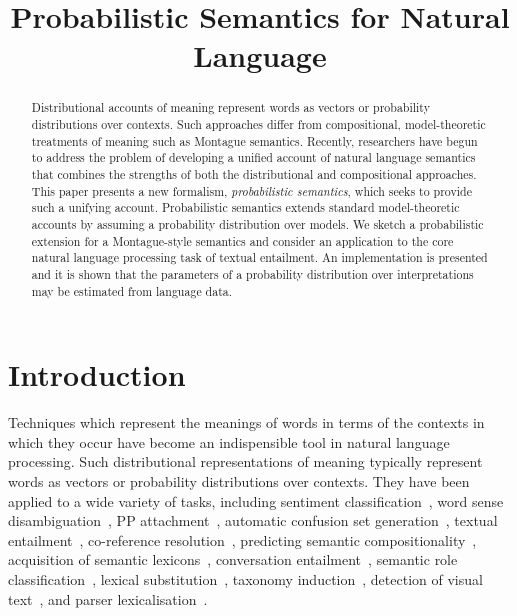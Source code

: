 \documentclass[letterpaper]{article}
\begin{document}
%
\title{Probabilistic Semantics for Natural Language}
\author{}
\maketitle
\begin{abstract}
Distributional accounts of meaning
represent words as vectors or probability distributions over
contexts. Such approaches differ from compositional, model-theoretic treatments of meaning
such as Montague semantics. Recently, researchers have begun to address the problem of  developing a unified account of natural language semantics that combines the strengths of both the distributional and compositional approaches. This paper presents a new formalism, {\em probabilistic semantics\/}, which seeks to provide such a unifying account. Probabilistic semantics extends standard model-theoretic
accounts by assuming a probability distribution over
models. We sketch a probabilistic extension for a Montague-style semantics and consider an application  to the core natural language processing task of textual entailment. An implementation is presented and it is shown that the parameters of a probability distribution over interpretations may be estimated from language data.


\end{abstract}


\section{Introduction}

Techniques which represent the meanings of words in terms of the contexts in
which they occur have become an indispensible tool in natural language
processing. Such distributional representations of meaning typically
represent words as vectors or probability distributions over
contexts. They have been applied to a wide variety of tasks,
including sentiment classification~\cite{Bollegala2011}, word sense
disambiguation~\cite{miller-EtAl:2012:PAPERS,khapra-EtAl:2010:ACL}, PP
attachment~\cite{Calvo05distributionalthesaurus}, automatic confusion
set generation~\cite{xue-hwa:2012:PAPERS}, textual
entailment~\cite{berant-dagan-goldberger:2010:ACL}, co-reference
resolution~\cite{lee-EtAl:2012:EMNLP-CoNLL}, predicting semantic
compositionality~\cite{bergsma-EtAl:2010:EMNLP}, acquisition of
semantic lexicons~\cite{mcintosh:2010:EMNLP}, conversation
entailment~\cite{zhang-chai:2010:EMNLP}, semantic role
classification~\cite{zapirain-EtAl:2010:NAACLHLT}, lexical
substitution~\cite{szarvas-biemann-gurevych:2013:NAACL-HLT}, taxonomy
induction~\cite{fountain-lapata:2012:NAACL-HLT}, detection of visual
text~\cite{dodge-EtAl:2012:NAACL-HLT}, and parser
lexicalisation~\cite{rei-briscoe:2013:NAACL-HLT}.
\end{document}
